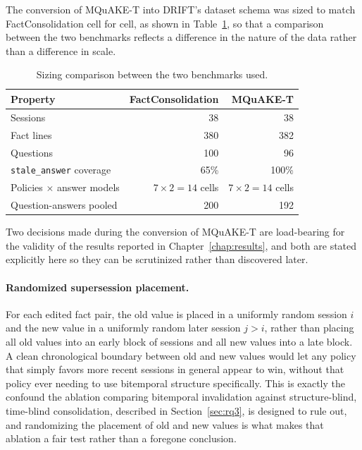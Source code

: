 The conversion of MQuAKE-T into DRIFT's dataset schema was sized to match FactConsolidation cell for cell, as shown in Table~\ref{tab:benchmark-sizing}, so that a comparison between the two benchmarks reflects a difference in the nature of the data rather than a difference in scale.

\begin{table}[H]
\centering
\caption{Sizing comparison between the two benchmarks used.}
\label{tab:benchmark-sizing}
\begin{tabular}{lrr}
\toprule
Property & FactConsolidation & MQuAKE-T \\
\midrule
Sessions & 38 & 38 \\
Fact lines & 380 & 382 \\
Questions & 100 & 96 \\
\texttt{stale\_answer} coverage & 65\% & 100\% \\
Policies $\times$ answer models & $7 \times 2 = 14$ cells & $7 \times 2 = 14$ cells \\
Question-answers pooled & 200 & 192 \\
\bottomrule
\end{tabular}
\end{table}

Two decisions made during the conversion of MQuAKE-T are load-bearing for the validity of the results reported in Chapter~\ref{chap:results}, and both are stated explicitly here so they can be scrutinized rather than discovered later.

\paragraph{Randomized supersession placement.} For each edited fact pair, the old value is placed in a uniformly random session $i$ and the new value in a uniformly random later session $j > i$, rather than placing all old values into an early block of sessions and all new values into a late block. A clean chronological boundary between old and new values would let any policy that simply favors more recent sessions in general appear to win, without that policy ever needing to use bitemporal structure specifically. This is exactly the confound the ablation comparing bitemporal invalidation against structure-blind, time-blind consolidation, described in Section~\ref{sec:rq3}, is designed to rule out, and randomizing the placement of old and new values is what makes that ablation a fair test rather than a foregone conclusion.

